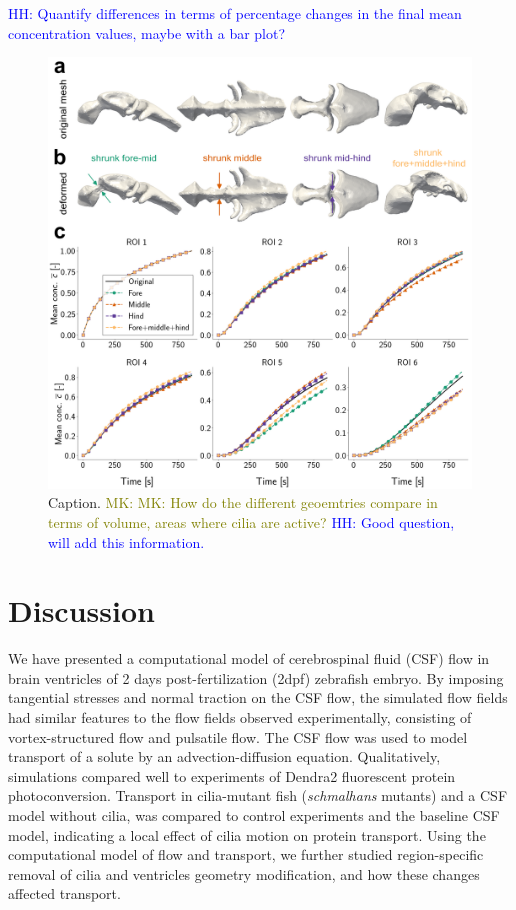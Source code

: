 \documentclass[fleqn]{wlscirep}
\newcommand{\lyng}[1]{\textcolor{blue}{#1}}
\newcommand{\mk}[1]{\textcolor{olive}{MK: #1}}
\begin{document}
\lyng{HH: Quantify differences in terms of percentage changes in the final mean concentration values, maybe with a bar plot?}
\begin{figure}[H]
    \centering
    \includegraphics[width=\textwidth]{graphics/figure6_compare_modified_geometries.png}
    \caption{Caption. \mk{MK: How do the different geoemtries compare in terms of volume, areas where cilia are active?} \lyng{HH: Good question, will add this information.}}
    \label{fig:figure6_sim_results_compare_geometries}
\end{figure}

\cleardoublepage


\section*{Discussion}
We have presented a computational model of cerebrospinal fluid (CSF) flow in brain ventricles of 2 days post-fertilization (2dpf) zebrafish embryo. By imposing tangential stresses and normal traction on the CSF flow, the simulated flow fields had similar features to the flow fields observed experimentally, consisting of vortex-structured flow and pulsatile flow. The CSF flow was used to model transport of a solute by an advection-diffusion equation. Qualitatively, simulations compared well to experiments of Dendra2 fluorescent protein photoconversion. Transport in cilia-mutant fish (\emph{schmalhans} mutants) and a CSF model without cilia, was compared to control experiments and the baseline CSF model, indicating a local effect of cilia motion on protein transport. Using the computational model of flow and transport, we further studied region-specific removal of cilia and ventricles geometry modification, and how these changes affected transport.
\end{document}
